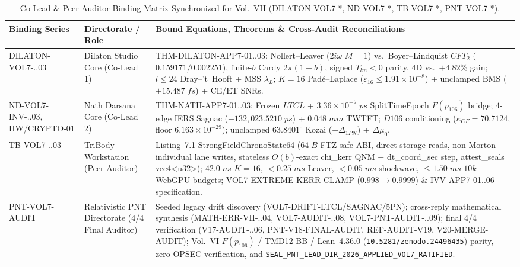 \documentclass[11pt,a4paper,reqno]{article}
\def\texttt#1{#1}%
\def\mathrm#1{#1}%
\def\mathcal#1{#1}%
\def\mathbb#1{#1}%
\def\F#1{F(#1)}%
\def\Done{D106}%
\def\LTCL{LTCL}%
\theoremstyle{plain}
\theoremstyle{definition}
\theoremstyle{remark}
\numberwithin{equation}{section}
\numberwithin{table}{section}
\newcommand{\F}[1]{\mathbb{F}_{#1}}
\newcommand{\Done}{\mathbb{D}_{106}}
\newcommand{\LTCL}{L_{\mathrm{TCL}}}
\providecommand{\zenodo}[1]{\href{https://doi.org/10.5281/zenodo.#1}{\nolinkurl{10.5281/zenodo.#1}}}
\begin{document}
\begin{table}[H]
\centering
\scriptsize
\caption{Co-Lead \& Peer-Auditor Binding Matrix Synchronized for Vol.~VII (\texttt{DILATON-VOL7-*}, \texttt{ND-VOL7-*}, \texttt{TB-VOL7-*}, \texttt{PNT-VOL7-*}).}
\label{tab:peer_bindings_vol7}
\setlength{\tabcolsep}{4pt}
\begin{tabularx}{\textwidth}{@{} P{3.05cm} P{3.00cm} Y @{}}
\toprule
\textbf{Binding Series} & \textbf{Directorate / Role} & \textbf{Bound Equations, Theorems \& Cross-Audit Reconciliations} \\
\midrule
\texttt{DILATON-\allowbreak VOL7-..03} & Dilaton Studio Core (Co-Lead 1) & \texttt{THM-DILATON-APP7-01..03}: Nollert--Leaver ($2i\omega$ $M=1$) vs.\ Boyer--Lindquist $\mathrm{CFT}_2$ ($0.159171 / 0.002251$), finite-$b$ Cardy $2\pi(1+b)$, signed $\mathcal{T}_{lm}<0$ parity, 4D vs.\ $+4.82\%$ gain; $l\le 24$ Dray--'t~Hooft + MSS $\lambda_L$; $K=16$ Pad\'e--Laplace ($\varepsilon_{16}\le 1.91\times 10^{-8}$) + unclamped BMS ($+15.487\;\mathrm{fs}$) + CE/ET SNRs. \\
\texttt{ND-\allowbreak VOL7-\allowbreak INV-..03}, \texttt{HW/CRYPTO-01} & Nath Darsana Core (Co-Lead 2) & \texttt{THM-NATH-APP7-01..03}: Frozen $\LTCL$ + $3.36\times 10^{-7}\;\mathrm{ps}$ \texttt{SplitTimeEpoch} $\F{p_{106}}$ bridge; $4$-edge IERS Sagnac ($-132{,}023.5210\;\mathrm{ps}$) + $0.048\;\mathrm{mm}$ TWTFT; $\Done$ conditioning ($\kappa_{\mathrm{CF}}=70.7124$, floor $6.163\times 10^{-29}$); unclamped $63.8401^\circ$ Kozai ($+\Delta_{1\mathrm{PN}}$) + $\Delta\mu_0$. \\
\texttt{TB-\allowbreak VOL7-..03} & TriBody Workstation (Peer Auditor) & Listing~7.1 \texttt{StrongFieldChronoState64} ($64\;\mathrm{B}$ FTZ-safe ABI, direct storage reads, non-Morton individual lane writes, stateless $\mathcal{O}(b)$-exact \texttt{chi\_kerr} QNM + \texttt{dt\_coord\_sec} step, \texttt{attest\_seals} \texttt{vec4<u32>}); $42.0\;\mathrm{ns}$ $K=16$, $<0.25\;\mathrm{ms}$ Leaver, $<0.05\;\mathrm{ms}$ shockwave, $\le 1.50\;\mathrm{ms}$ $10\mathrm{k}$ WebGPU budgets; \texttt{VOL7-EXTREME-KERR-CLAMP} ($0.998\to 0.9999$) \& \texttt{IVV-APP7-01..06} specification. \\
\texttt{PNT-\allowbreak VOL7-\allowbreak AUDIT} & Relativistic PNT Directorate (4/4 Final Auditor) & Seeded legacy drift discovery (\texttt{VOL7-\allowbreak DRIFT-\allowbreak LTCL/SAGNAC/5PN}); cross-reply mathematical synthesis (\texttt{MATH-\allowbreak ERR-\allowbreak VII-..04}, \texttt{VOL7-\allowbreak AUDIT-..08}, \texttt{VOL7-\allowbreak PNT-\allowbreak AUDIT-..09}); final 4/4 verification (\texttt{V17-\allowbreak AUDIT-\allowbreak 01..06}, \texttt{PNT-\allowbreak V18-\allowbreak FINAL-\allowbreak AUDIT}, \texttt{REF-\allowbreak AUDIT-\allowbreak V19}, \texttt{V20-\allowbreak MERGE-\allowbreak AUDIT}); Vol.~VI $\F{p_{106}}$ / \texttt{TMD12-BB} / Lean~4.36.0 (\zenodo{24496435}) parity, zero-OPSEC verification, and \nolinkurl{SEAL_PNT_LEAD_DIR_2026_APPLIED_VOL7_RATIFIED}. \\
\bottomrule
\end{tabularx}
\end{table}
\end{document}
